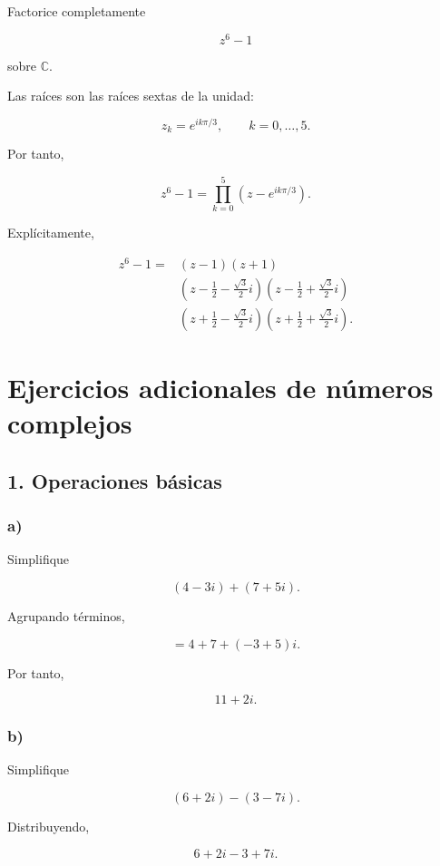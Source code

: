 \documentclass[12pt]{article}
\begin{document}
Factorice completamente

\[
z^6-1
\]

sobre \(\mathbb C\).

Las raíces son las raíces sextas de la unidad:

\[
z_k=e^{ik\pi/3},
\qquad k=0,\ldots,5.
\]

Por tanto,

\[
z^6-1
=
\prod_{k=0}^{5}
\left(
z-e^{ik\pi/3}
\right).
\]

Explícitamente,

\[
\boxed{
\begin{aligned}
z^6-1
={}&(z-1)(z+1)\\
&\left(
z-\frac12-\frac{\sqrt3}{2}i
\right)
\left(
z-\frac12+\frac{\sqrt3}{2}i
\right)\\
&\left(
z+\frac12-\frac{\sqrt3}{2}i
\right)
\left(
z+\frac12+\frac{\sqrt3}{2}i
\right).
\end{aligned}}
\]

\section*{Ejercicios adicionales de números complejos}

\subsection*{1. Operaciones básicas}

\subsubsection*{a)}

Simplifique

\[
(4-3i)+(7+5i).
\]

Agrupando términos,

\[
=4+7+(-3+5)i.
\]

Por tanto,

\[
\boxed{11+2i}.
\]

\subsubsection*{b)}

Simplifique

\[
(6+2i)-(3-7i).
\]

Distribuyendo,

\[
6+2i-3+7i.
\]
\end{document}
